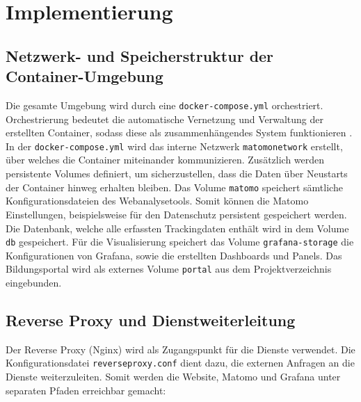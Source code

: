 \chapter{Implementierung}
\label{ch:implementierung}

\section{Netzwerk- und Speicherstruktur der Container-Umgebung}
Die gesamte Umgebung wird durch eine \texttt{docker-compose.yml} orchestriert. Orchestrierung bedeutet die automatische Vernetzung und Verwaltung der erstellten Container, sodass diese als zusammenhängendes System funktionieren \parencite{AWS}. In der \texttt{docker-compose.yml} wird das interne Netzwerk \texttt{matomo\textunderscore network} erstellt, über welches die Container miteinander kommunizieren. Zusätzlich werden persistente Volumes definiert, um sicherzustellen, dass die Daten über Neustarts der Container hinweg erhalten bleiben. Das Volume \texttt{matomo} speichert sämtliche Konfigurationsdateien des Webanalysetools. Somit können die Matomo Einstellungen, beispielsweise für den Datenschutz persistent gespeichert werden. Die Datenbank, welche alle erfassten Trackingdaten enthält wird in dem Volume \texttt{db} gespeichert. Für die Visualisierung speichert das Volume \texttt{grafana-storage} die Konfigurationen von Grafana, sowie die erstellten Dashboards und Panels. Das Bildungsportal wird als externes Volume \texttt{portal} aus dem Projektverzeichnis eingebunden.

\section{Reverse Proxy und Dienstweiterleitung}
Der Reverse Proxy (Nginx) wird als Zugangspunkt für die Dienste verwendet. Die Konfigurationsdatei \texttt{reverse\textunderscore proxy.conf} dient dazu, die externen Anfragen an die Dienste weiterzuleiten. Somit werden die Website, Matomo und Grafana unter separaten Pfaden erreichbar gemacht: 

